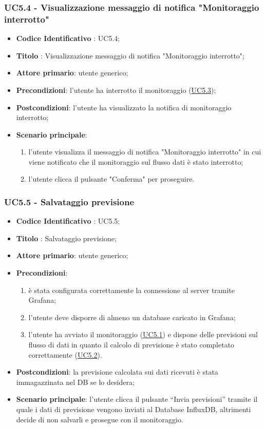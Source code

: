 	\label{par:UC5.4}
	\subsubsection{UC5.4 - Visualizzazione messaggio di notifica "Monitoraggio interrotto"}
		\begin{itemize}
			\item\textbf{Codice Identificativo} : UC5.4;
			\item\textbf{Titolo} : Visualizzazione messaggio di notifica "Monitoraggio interrotto";
			\item\textbf{Attore primario}: utente generico;
			\item\textbf{Precondizioni}: l'utente ha interrotto il monitoraggio (\hyperref[par:UC5.3]{UC5.3});
			\item\textbf{Postcondizioni}: l'utente ha visualizzato la notifica di monitoraggio interrotto;
			\item\textbf{Scenario principale}:
				\begin{enumerate}
					\item l'utente visualizza il messaggio di notifica "Monitoraggio interrotto" in cui viene notificato che il monitoraggio sul flusso dati è stato interrotto;
					\item l'utente clicca il pulsante "Conferma" per proseguire.		
				\end{enumerate}		
		\end{itemize}
		
	\label{par:UC5.5}
	\subsubsection{UC5.5 - Salvataggio previsione}
		\begin{itemize}
			\item\textbf{Codice Identificativo} : UC5.5;
			\item\textbf{Titolo} : Salvataggio previsione;
			\item\textbf{Attore primario}: utente generico;
			\item\textbf{Precondizioni}:
				\begin{enumerate}
					\item è stata configurata correttamente la connessione al server tramite Grafana;
					\item l'utente deve disporre di almeno un database caricato in Grafana;
					\item l'utente ha avviato il monitoraggio (\hyperref[par:UC5.1]{UC5.1}) e dispone delle previsioni sul flusso di dati in quanto il calcolo di previsione è stato completato correttamente (\hyperref[par:UC5.2]{UC5.2}).
				\end{enumerate}
			\item\textbf{Postcondizioni}: la previsione calcolata sui dati ricevuti è stata immagazzinata nel DB se lo desidera;
			\item\textbf{Scenario principale}: l'utente clicca il pulsante “Invia previsioni” tramite il quale i dati di previsione vengono inviati al Database InfluxDB, altrimenti decide di non salvarli e prosegue con il monitoraggio.
			
		\end{itemize}	
		
